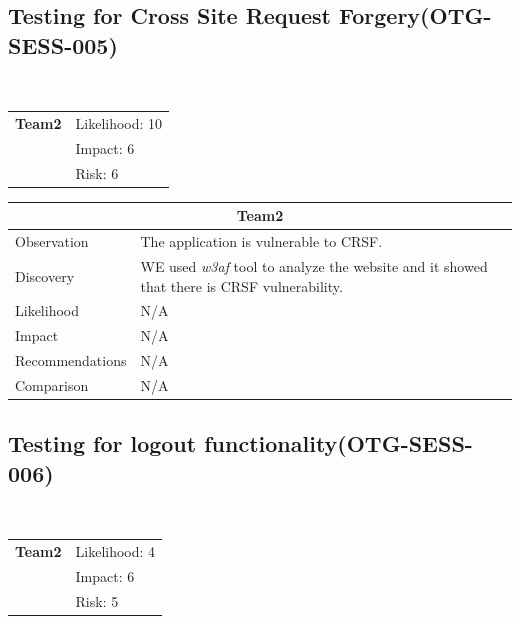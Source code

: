 \documentclass[headsepline,footsepline,footinclude=false,oneside,fontsize=11pt,paper=a4,listof=totoc,bibliography=totoc]{scrbook} %
\begin{document}
\subsection{Testing for Cross Site Request Forgery(OTG-SESS-005)}\
\begin{tabular}{cR{12cm}}
	\textbf{Team2} & Likelihood: 10\\& Impact: 6\\& Risk: 6
\end{tabular}

\begin{tabular}{ l|p{11cm}  }
	\hline
	\multicolumn{2}{c}{\textbf{Team2}} \\
	\hline
	Observation & The application is vulnerable to CRSF.\\
	Discovery & WE used \textit{w3af} tool to analyze the website and it showed that there is CRSF vulnerability.\\
	Likelihood & N/A\\
	Impact & N/A  \\
	Recommendations & N/A\\
	Comparison & N/A\\
	\hline
\end{tabular}

\pagebreak
\subsection{Testing for logout functionality(OTG-SESS-006)}\

\begin{tabular}{cR{12cm}}
	\textbf{Team2} & Likelihood: 4\\& Impact: 6\\& Risk: 5
\end{tabular}
\end{document}
